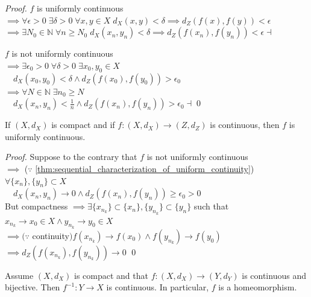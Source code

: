 \documentclass[notoc,notitlepage]{tufte-book}
\begin{document}
\begin{proof}
   $f$ is uniformly continuous \\
  $\implies \forall \epsilon > 0 \; \exists \delta > 0 \; \forall x, y \in X \; d_X(x, y) < \delta \implies d_Z(f(x), f(y)) < \epsilon$ \\
  $\implies \exists N_0 \in \mathbb{N} \; \forall n \geq N_0 \; d_X(x_n, y_n) < \delta \implies d_Z(f(x_n), f(y_n)) < \epsilon \dashv$

  \noindent
   $f$ is not uniformly continuous \\
  $\implies \exists \epsilon_0 > 0 \; \forall \delta > 0 \; \exists x_0, y_0 \in X$ \\
  $\quad d_X(x_0, y_0) < \delta \land d_Z(f(x_0), f(y_0)) > \epsilon_0$ \\
  $\implies \forall N \in \mathbb{N} \; \exists n_0 \geq N$ \\
  $\quad d_X(x_n, y_n) < \frac{1}{n} \land d_Z(f(x_n), f(y_n)) > \epsilon_0 \dashv$\qed\
\end{proof}

\begin{thm}\label{thm:continuous_functions_from_a_compact_set_is_uniformly_continuous}
  If $(X, d_X)$ is compact and if $f : (X, d_X) \to (Z, d_Z)$ is continuous, then $f$ is uniformly continuous.
\end{thm}

\begin{proof}
  Suppose to the contrary that $f$ is not uniformly continuous \\
  $\implies$ ($\because$ \cref{thm:sequential_characterization_of_uniform_continuity}) $\forall \{ x_n \}, \{ y_n \} \subset X$ \\
  $\quad d_X(x_n, y_n) \to 0 \land d_Z(f(x_n), f(y_n)) \geq \epsilon_0 > 0$ \\
  \noindent
  But compactness $\implies \exists \{ x_{n_k} \} \subset \{ x_n \}, \{ y_{n_k} \} \subset \{ y_n \}$ such that \\
  $x_{n_k} \to x_0 \in X \land y_{n_k} \to y_0 \in X$ \\
  $\implies (\because$ continuity$) f(x_{n_k}) \to f(x_0) \land f(y_{n_k}) \to f(y_0)$ \\
  $\implies d_Z(f(x_{n_k}), f(y_{n_k})) \to 0$ \Lightning\qed\
\end{proof}

\begin{thm}\label{thm:continuous_bijections_from_a_compact_space_is_a_homeomorphism}
  Assume $(X, d_X)$ is compact and that $f: (X, d_X) \to (Y, d_Y)$ is continuous and bijective. Then $f^{-1} : Y \to X$ is continuous. In particular, $f$ is a homeomorphism.
\end{thm}
\end{document}
